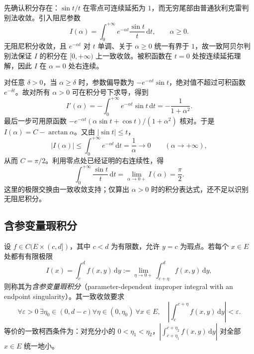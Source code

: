 \begin{solve}
先确认积分存在：$\sin t/t$ 在零点可连续延拓为 $1$，而无穷尾部由普通狄利克雷判别法收敛。引入阻尼参数
\[
    I(\alpha)=\int_0^{+\infty}e^{-\alpha t}\frac{\sin t}{t}\,\mathrm{d}t,
    \qquad\alpha\geq0.
\]
无阻尼积分收敛，且 $e^{-\alpha t}$ 对 $t$ 单调、关于 $\alpha\geq0$ 统一有界于 $1$，故一致阿贝尔判别法保证 $I$ 的积分在 $[0,+\infty)$ 上一致收敛。被积函数在 $t=0$ 处按连续延拓理解，因此 $I$ 在 $\alpha=0$ 处右连续。

对任意 $\delta>0$，当 $\alpha\geq\delta$ 时，参数偏导数为 $-e^{-\alpha t}\sin t$，绝对值不超过可积函数 $e^{-\delta t}$。故对所有 $\alpha>0$ 可在积分号下求导，得到
\[
    I'(\alpha)=-\int_0^{+\infty}e^{-\alpha t}\sin t\,\mathrm{d}t
    =-\frac1{1+\alpha^2}.
\]
最后一步可用原函数 $-e^{-\alpha t}(\alpha\sin t+\cos t)/(1+\alpha^2)$ 核对。于是 $I(\alpha)=C-\arctan\alpha$。又由 $|\sin t|\leq t$，
\[
    |I(\alpha)|\leq\int_0^{+\infty}e^{-\alpha t}\,\mathrm{d}t
    =\frac1\alpha\longrightarrow0\qquad(\alpha\to+\infty),
\]
从而 $C=\pi/2$。利用零点处已经证明的右连续性，得
\begin{equation}
    \int_0^{+\infty}\frac{\sin t}{t}\,\mathrm{d}t
    =\lim_{\alpha\to0+}I(\alpha)=\frac\pi2.
    \label{eq:parameter-dirichlet-integral-value}
\end{equation}
这里的极限交换由一致收敛支持；仅算出 $\alpha>0$ 时的积分表达式，还不足以识别无阻尼积分。
\end{solve}

\subsection{含参变量瑕积分}
\label{subsec:parameter-dependent-singular-integrals}

设 $f\in C(E\times(c,d])$，其中 $c<d$ 为有限数，允许 $y=c$ 为瑕点。若每个 $x\in E$ 处都有有限极限
\[
    I(x)=\int_c^d f(x,y)\,\mathrm{d}y
    :=\lim_{\eta\to0+}\int_{c+\eta}^d f(x,y)\,\mathrm{d}y,
\]
则称其为\emph{含参变量瑕积分}（parameter-dependent improper integral with an endpoint singularity）。其一致收敛要求
\begin{equation}
    \forall\varepsilon>0\ \exists\eta_0\in(0,d-c)
    \forall\eta\in(0,\eta_0)\ \forall x\in E,
    \quad\left|\int_c^{c+\eta}f(x,y)\,\mathrm{d}y\right|<\varepsilon.
    \label{eq:parameter-singular-uniform-tail}
\end{equation}
等价的一致柯西条件为：对充分小的 $0<\eta_1<\eta_2$，$|\int_{c+\eta_1}^{c+\eta_2}f(x,y)\,\mathrm{d}y|$ 对全部 $x\in E$ 统一地小。

